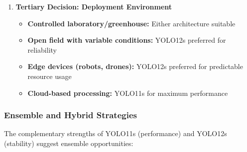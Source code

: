 \begin{enumerate}
\begin{itemize}
        \item For \textbf{Fine24} (fine-grained classification):
        \begin{itemize}
            \item YOLO12s recommended despite 0.45\% lower performance
            \item Rationale: 21.9\% stability improvement critical for complex tasks
        \end{itemize}
        
        \item For \textbf{Coarse1} (single-class detection):
        \begin{itemize}
            \item YOLO12s recommended for 16\% stability improvement
            \item Performance difference (0.76\%) negligible for basic detection
        \end{itemize}
    \end{itemize}
    
    \item \textbf{Tertiary Decision: Deployment Environment}
    
    \begin{itemize}
        \item \textbf{Controlled laboratory/greenhouse:} Either architecture suitable
        \item \textbf{Open field with variable conditions:} YOLO12s preferred for reliability
        \item \textbf{Edge devices (robots, drones):} YOLO12s preferred for predictable resource usage
        \item \textbf{Cloud-based processing:} YOLO11s for maximum performance
    \end{itemize}
\end{enumerate}

\subsubsection{Ensemble and Hybrid Strategies}

The complementary strengths of YOLO11s (performance) and YOLO12s (stability) suggest ensemble opportunities:

